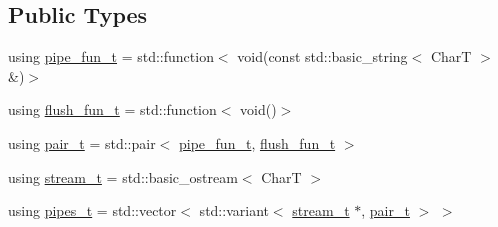 \subsection*{Public Types}
\begin{DoxyCompactItemize}
\item 
using \hyperlink{structdevfix_1_1base_1_1strout_a89bb8340fe2e43bb14c829a1d427d9c0}{pipe\+\_\+fun\+\_\+t} = std\+::function$<$ void(const std\+::basic\+\_\+string$<$ CharT $>$ \&)$>$
\item 
using \hyperlink{structdevfix_1_1base_1_1strout_ad6cf2897069f246b884fa8d526f8bab1}{flush\+\_\+fun\+\_\+t} = std\+::function$<$ void()$>$
\item 
using \hyperlink{structdevfix_1_1base_1_1strout_a2212cb8a99abec10490e891cc67820bb}{pair\+\_\+t} = std\+::pair$<$ \hyperlink{structdevfix_1_1base_1_1strout_a89bb8340fe2e43bb14c829a1d427d9c0}{pipe\+\_\+fun\+\_\+t}, \hyperlink{structdevfix_1_1base_1_1strout_ad6cf2897069f246b884fa8d526f8bab1}{flush\+\_\+fun\+\_\+t} $>$
\item 
using \hyperlink{structdevfix_1_1base_1_1strout_a158aadfad348eeac7c56a8b43699a4d3}{stream\+\_\+t} = std\+::basic\+\_\+ostream$<$ CharT $>$
\item 
using \hyperlink{structdevfix_1_1base_1_1strout_acf852ff3e37e6d10e2cf0332df2b8e2d}{pipes\+\_\+t} = std\+::vector$<$ std\+::variant$<$ \hyperlink{structdevfix_1_1base_1_1strout_a158aadfad348eeac7c56a8b43699a4d3}{stream\+\_\+t} $\ast$, \hyperlink{structdevfix_1_1base_1_1strout_a2212cb8a99abec10490e891cc67820bb}{pair\+\_\+t} $>$ $>$
\end{DoxyCompactItemize}
